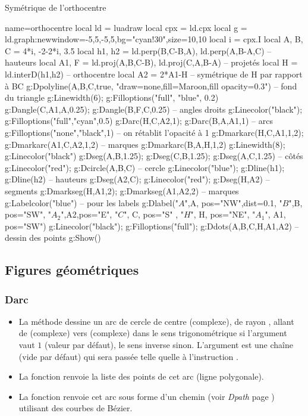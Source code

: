 \begin{demo}{Symétrique de l'orthocentre}
\begin{luadraw}{name=orthocentre}
local ld = luadraw
local cpx = ld.cpx
local g = ld.graph:new{window={-5,5,-5,5},bg="cyan!30",size={10,10}}
local i = cpx.I
local A, B, C = 4*i, -2-2*i, 3.5
local h1, h2 = ld.perp({B,C-B},A), ld.perp({A,B-A},C) -- hauteurs
local A1, F = ld.proj(A,{B,C-B}), ld.proj(C,{A,B-A}) -- projetés
local H = ld.interD(h1,h2) -- orthocentre
local A2 = 2*A1-H -- symétrique de H par rapport à BC
g:Dpolyline({A,B,C},true, "draw=none,fill=Maroon,fill opacity=0.3") -- fond du triangle
g:Linewidth(6); g:Filloptions("full", "blue", 0.2)
g:Dangle(C,A1,A,0.25); g:Dangle(B,F,C,0.25) -- angles droits
g:Linecolor("black"); g:Filloptions("full","cyan",0.5)
g:Darc(H,C,A2,1); g:Darc(B,A,A1,1) -- arcs
g:Filloptions("none","black",1) -- on rétablit l'opacité à 1
g:Dmarkarc(H,C,A1,1,2); g:Dmarkarc(A1,C,A2,1,2) -- marques
g:Dmarkarc(B,A,H,1,2)
g:Linewidth(8); g:Linecolor("black")
g:Dseg({A,B},1.25); g:Dseg({C,B},1.25); g:Dseg({A,C},1.25) -- côtés
g:Linecolor("red"); g:Dcircle(A,B,C) -- cercle
g:Linecolor("blue"); g:Dline(h1); g:Dline(h2) -- hauteurs
g:Dseg({A2,C}); g:Linecolor("red"); g:Dseg({H,A2}) -- segments
g:Dmarkseg(H,A1,2); g:Dmarkseg(A1,A2,2) -- marques
g:Labelcolor("blue") -- pour les labels
g:Dlabel("$A$",A, {pos="NW",dist=0.1}, "$B$",B, {pos="SW"}, "$A_2$",A2,{pos="E"},
"$C$", C, {pos="S" }, "$H$", H, {pos="NE"}, "$A_1$", A1, {pos="SW"})
g:Linecolor("black"); g:Filloptions("full"); g:Ddots({A,B,C,H,A1,A2}) -- dessin des points
g:Show()
\end{luadraw}
\end{demo}

\subsection{Figures géométriques}

\subsubsection{Darc}
\begin{itemize}
    \item La méthode  dessine un arc de cercle de centre  (complexe), de rayon , allant de  (complexe) vers  (complexe) dans le sens trigonométrique si l'argument  vaut $1$ (valeur par défaut), le sens inverse sinon. L'argument  est une chaîne (vide par défaut) qui sera passée telle quelle à l'instruction \drawcmd.
    \item La fonction  renvoie la liste des points de cet arc (ligne polygonale). 
    \item La fonction  renvoie cet arc sous forme d'un chemin (voir \emph{Dpath} page \pageref{Dpath}) utilisant des courbes de Bézier.
\end{itemize}

